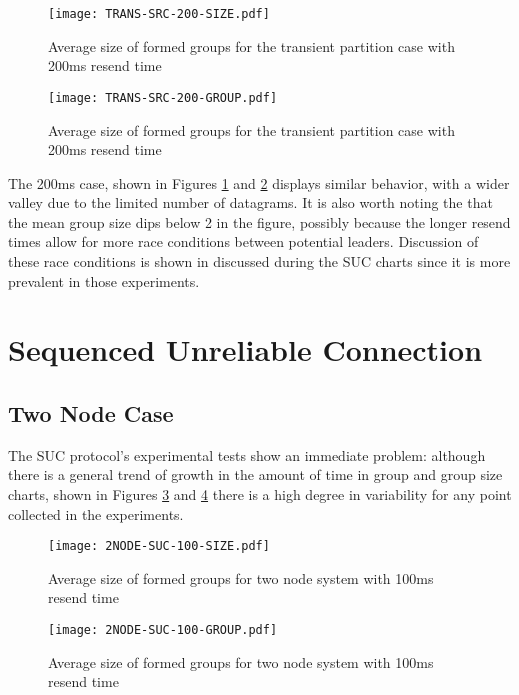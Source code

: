 \begin{figure}[!h]
\centering
\texttt{[image: TRANS-SRC-200-SIZE.pdf]}
\caption{Average size of formed groups for the transient partition case with 200ms resend time}
\label{fig:MGS-SRC-TRANS-200}
\end{figure}

\begin{figure}[!h]
\centering
\texttt{[image: TRANS-SRC-200-GROUP.pdf]}
\caption{Average size of formed groups for the transient partition case with 200ms resend time}
\label{fig:IGT-SRC-TRANS-200}
\end{figure}

The 200ms case, shown in Figures \ref{fig:MGS-SRC-TRANS-200} and \ref{fig:IGT-SRC-TRANS-200} displays similar behavior, with a wider valley due to the
limited number of datagrams. It is also worth noting the that the mean group
size dips below 2 in the figure, possibly because the longer resend times allow
for more race conditions between potential leaders. Discussion of these race
conditions is shown in discussed during the SUC charts since it is more prevalent
in those experiments.

\section{Sequenced Unreliable Connection}

\subsection{Two Node Case}

The SUC protocol's experimental tests show an immediate problem: although there
is a general trend of growth in the amount of time in group and group size
charts, shown in Figures \ref{fig:MGS-SUC-2NODE-100} and \ref{fig:IGT-SUC-2NODE-100}
there is a high degree in variability for any point collected in the experiments.

\begin{figure}[!h]
\centering
\texttt{[image: 2NODE-SUC-100-SIZE.pdf]}
\caption{Average size of formed groups for two node system with 100ms resend time}
\label{fig:MGS-SUC-2NODE-100}
\end{figure}

\begin{figure}[!h]
\centering
\texttt{[image: 2NODE-SUC-100-GROUP.pdf]}
\caption{Average size of formed groups for two node system with 100ms resend time}
\label{fig:IGT-SUC-2NODE-100}
\end{figure}

